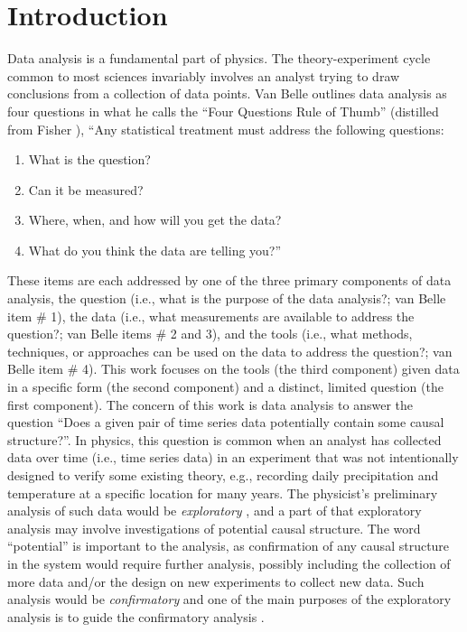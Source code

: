 \chapter{Introduction} 
Data analysis is a fundamental part of physics.  The theory-experiment cycle common to most sciences \cite{Godfrey2009} invariably involves an analyst trying to draw conclusions from a collection of data points.  Van Belle outlines data analysis as four questions in what he calls the ``Four Questions Rule of Thumb'' \cite{Van2011} (distilled from Fisher \cite{Fisher1960}),  ``Any statistical treatment must address the following questions:
\begin{enumerate}
\item What is the question?
\item Can it be measured?
\item Where, when, and how will you get the data?
\item What do you think the data are telling you?''
\end{enumerate}
These items are each addressed by one of the three primary components of data analysis, the question (i.e., what is the purpose of the data analysis?; van Belle item \# 1), the data (i.e., what measurements are available to address the question?; van Belle items \# 2 and 3), and the tools (i.e., what methods, techniques, or approaches can be used on the data to address the question?; van Belle item \# 4).  This work focuses on the tools (the third component) given data in a specific form (the second component) and a distinct, limited question (the first component).  The concern of this work is data analysis to answer the question ``Does a given pair of time series data potentially contain some causal structure?''.  In physics, this question is common when an analyst has collected data over time (i.e., time series data) in an experiment that was not intentionally designed to verify some existing theory, e.g., recording daily precipitation and temperature at a specific location for many years.  The physicist's preliminary analysis of such data would be {\em exploratory} \cite{Tukey1977}, and a part of that exploratory analysis may involve investigations of potential causal structure.  The word ``potential'' is important to the analysis, as confirmation of any causal structure in the system would require further analysis, possibly including the collection of more data and/or the design on new experiments to collect new data.  Such analysis would be {\em confirmatory} and one of the main purposes of the exploratory analysis is to guide the confirmatory analysis \cite{Tukey1977}.

